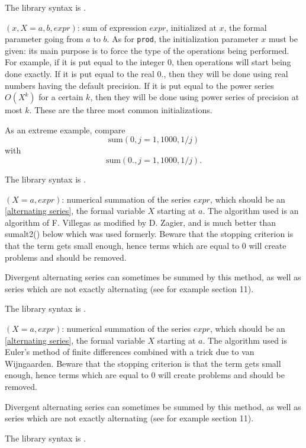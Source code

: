 The library syntax is .

$(x,X=a,b,expr)$: sum of expression $expr$, initialized at
$x$, the formal parameter going from $a$ to $b$. As for {\tt prod}, the
initialization parameter $x$ must be given: its main purpose is to force
the type of the operations being performed. For example, if it is put
equal to the integer 0, then operations will start being done exactly. 
If it is put equal to the real $0.$, then they will be done using real
numbers having the default precision. If it is put equal to the power
series $O(X^k)$ for a certain $k$, then they will be done using power
series of precision at most $k$. These are the three most common
initializations.

As an extreme example, compare $$\text{sum}(0,j=1, 1000, 1/j)$$
with  $$\text{sum}(0.,j=1, 1000, 1/j ).$$

The library syntax is .

$(X=a, expr)$: numerical summation of the series $expr$,
which should be an \ref{alternating series}, the formal variable $X$ 
starting at $a$. The algorithm used is an algorithm of F. Villegas as modified by
D. Zagier, and is much better than sumalt2() below which was used formerly.
Beware that the stopping criterion is that the term gets small enough, hence
terms which are equal to 0 will create problems and should be removed.

Divergent alternating series can sometimes be summed by this method, as well as
series which are not exactly alternating (see for example section 11).

The library syntax is .

$(X=a, expr)$: numerical summation of the series $expr$,
which should be an \ref{alternating series}, the formal variable $X$ 
starting at $a$. The algorithm used is Euler's method of finite differences
combined with a trick due to van Wijngaarden.
Beware that the stopping criterion is that the term gets small enough, hence
terms which are equal to 0 will create problems and should be removed.

Divergent alternating series can sometimes be summed by this method, as well as
series which are not exactly alternating (see for example section 11).

The library syntax is .

